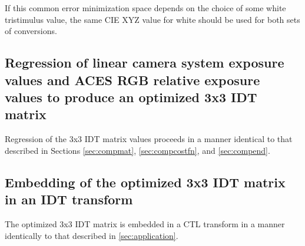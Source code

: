 If this common error minimization space depends on the choice of some white tristimulus value, the same CIE XYZ value for white should be used for both sets of conversions. 

\subsection*{Regression of linear camera system exposure values and ACES RGB relative exposure values to produce an optimized 3x3 IDT matrix}

Regression of the 3x3 IDT matrix values proceeds in a manner identical to that described in Sections \ref{sec:compmat}, \ref{sec:compcostfn}, and \ref{sec:compend}.

\subsection*{Embedding of the optimized 3x3 IDT matrix in an IDT transform}
The optimized 3x3 IDT matrix is embedded in a CTL transform in a manner identically to that described in \autoref{sec:application}.